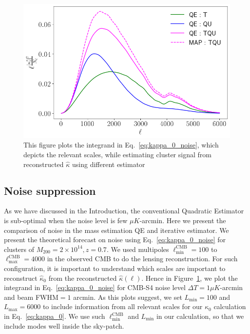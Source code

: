 \documentclass[prd, superscriptaddress, tightenlines, longbibliography, nofootinbib, eqsecnum, amsfonts, amsmath, floatfix, twocolumn, notitlepage]{revtex4-2}
\begin{document}
\begin{figure}
    \centering
    \hspace*{-1.0cm} 
    \includegraphics[width=1.\hsize]{Figures/Integrand.png}
    \caption{This figure plots the integrand in Eq.~\ref{eq:kappa_0_noise}, which depicts the relevant scales, while estimating cluster signal from reconstructed $\hat{\kappa}$ using different estimator}
    \label{fig:int}
\end{figure}
\subsection{Noise suppression}
As we have discussed in the Introduction, the conventional Quadratic Estimator is sub-optimal when the noise level is few $\mu K$-arcmin. Here we present the comparison of noise in the mass estimation QE and iterative estimator. We present the theoretical forecast on noise using Eq.~\ref{eq:kappa_0_noise} for clusters of $M_{200} = 2\times 10^{14}, z=0.7$. We used multipoles $\ell_{\text{min}}^{\text{CMB}} = 100$ to $\ell_{\text{max}}^{\text{CMB}} = 4000$ in the observed CMB to do the lensing reconstruction. For such configuration, it is important to understand which scales are important to reconstruct $\hat{\kappa}_0$ from the reconstructed $\hat{\kappa}(\ell)$. Hence in Figure~\ref{fig:int}, we plot the integrand in Eq.~\ref{eq:kappa_0_noise} for CMB-S4 noise level $\Delta T  = 1 \mu K$-arcmin and beam FWHM$=1$ arcmin. As this plots suggest, we set $L_{\text{min}}=100$ and $L_{\text{max}}=6000$ to include information from all relevant scales for our $\hat{\kappa}_0$ calculation in Eq.~\ref{eq:kappa_0}. We use such $\ell_{\text{min}}^{\text{CMB}}$ and $L_{\text{min}}$ in our calculation, so that we include modes well inside the sky-patch. 
\end{document}
